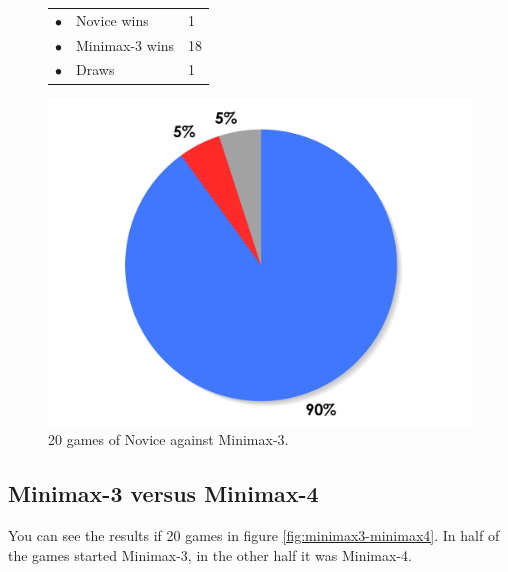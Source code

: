 \documentclass[paper=a4, fontsize=11pt]{article} %
\newcommand{\ra}[1]{\renewcommand{\arraystretch}{#1}}
\begin{document}
\begin{figure}[ht]
    \begin{minipage}[c]{0.40\linewidth}
        \centering
        \ra{1.3}
        \begin{tabular}{cll}
            \toprule
            \textcolor{red!100}{$\bullet$} & Novice wins & 1       \\
            \textcolor{blue!100!yellow!100!red!80}{$\bullet$} & Minimax-3 wins & 18      \\  
            \textcolor{gray!100}{$\bullet$} & Draws & 1      \\  
            \bottomrule
        \end{tabular}
    \end{minipage}
    \begin{minipage}[c]{0.60\linewidth}
        \centering
        \includegraphics[scale=0.35]{img/novice-minimax3.pdf}
    \end{minipage}
    \caption{20 games of Novice against  Minimax-3.}
    \label{fig:novice-minimax3}
\end{figure}


\subsection{Minimax-3 versus Minimax-4}
You can see the results if 20 games in figure \ref{fig:minimax3-minimax4}. 
In half of the games started Minimax-3, in the other half it was Minimax-4.
\end{document}
